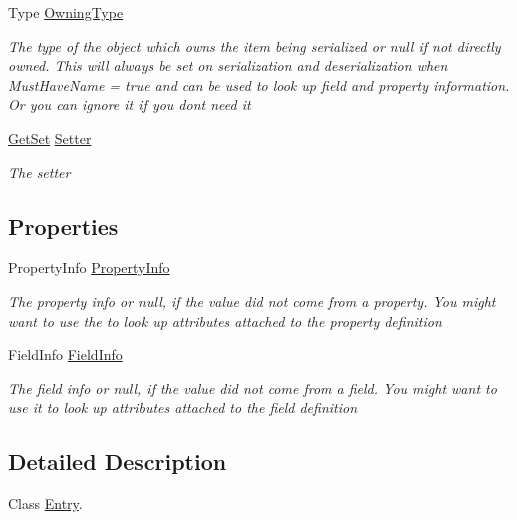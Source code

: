\begin{DoxyCompactItemize}
Type \hyperlink{class_serialization_1_1_entry_a1fd7fb4ac04afda6919998688f741e33}{Owning\+Type}
\begin{DoxyCompactList}\small\item\em The type of the object which owns the item being serialized or null if not directly owned. This will always be set on serialization and deserialization when Must\+Have\+Name = true and can be used to look up field and property information. Or you can ignore it if you don\textquotesingle{}t need it \end{DoxyCompactList}\item 
\hyperlink{class_serialization_1_1_get_set}{Get\+Set} \hyperlink{class_serialization_1_1_entry_a7f497ef992f38fceb6c4aea8643a7caf}{Setter}
\begin{DoxyCompactList}\small\item\em The setter \end{DoxyCompactList}\end{DoxyCompactItemize}
\subsection*{Properties}
\begin{DoxyCompactItemize}
\item 
Property\+Info \hyperlink{class_serialization_1_1_entry_a079414059819b92c873921247bc0686b}{Property\+Info}
\begin{DoxyCompactList}\small\item\em The property info or null, if the value did not come from a property. You might want to use the to look up attributes attached to the property definition \end{DoxyCompactList}\item 
Field\+Info \hyperlink{class_serialization_1_1_entry_ac9c4d67292047b6a3f9a3d3fcdccb09e}{Field\+Info}
\begin{DoxyCompactList}\small\item\em The field info or null, if the value did not come from a field. You might want to use it to look up attributes attached to the field definition \end{DoxyCompactList}\end{DoxyCompactItemize}


\subsection{Detailed Description}
Class \hyperlink{class_serialization_1_1_entry}{Entry}. 



